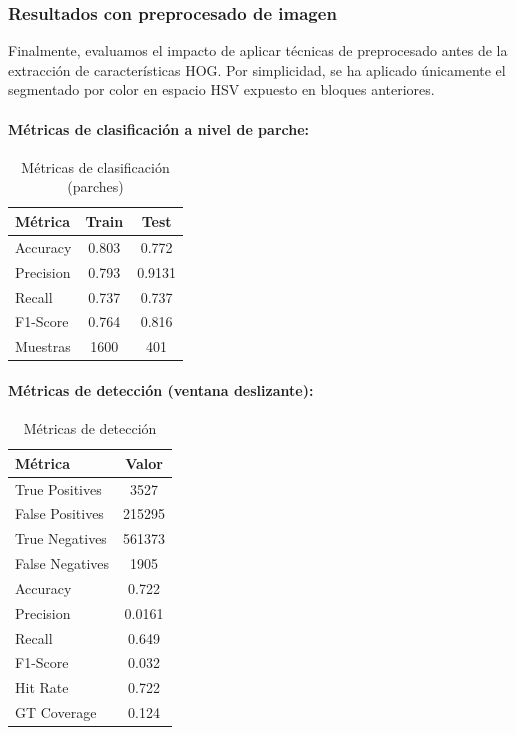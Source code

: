 \documentclass[11pt,a4paper]{article}
\begin{document}
\subsubsection{Resultados con preprocesado de imagen}

Finalmente, evaluamos el impacto de aplicar técnicas de preprocesado antes de 
la extracción de características HOG. Por simplicidad, se ha aplicado únicamente
el segmentado por color en espacio HSV expuesto en bloques anteriores.

\paragraph{Métricas de clasificación a nivel de parche:}
\begin{table}[H]
    \centering
    \caption{Métricas de clasificación (parches)}
    \label{tab:hog_preprocess_patch}
    \begin{tabular}{lcc}
        \toprule
        \textbf{Métrica} & \textbf{Train} & \textbf{Test} \\
        \midrule
        Accuracy & 0.803 & 0.772 \\
        Precision & 0.793 & 0.9131 \\
        Recall & 0.737 & 0.737 \\
        F1-Score & 0.764 & 0.816\\
        Muestras & 1600 & 401 \\
        \bottomrule
    \end{tabular}
\end{table}

\paragraph{Métricas de detección (ventana deslizante):}
\begin{table}[H]
    \centering
    \caption{Métricas de detección}
    \label{tab:hog_preprocess_detection}
    \begin{tabular}{lc}
        \toprule
        \textbf{Métrica} & \textbf{Valor} \\
        \midrule
        True Positives & 3527 \\
        False Positives & 215295 \\
        True Negatives & 561373 \\
        False Negatives & 1905 \\
        Accuracy & 0.722 \\
        Precision & 0.0161 \\
        Recall & 0.649\\
        F1-Score & 0.032 \\
        Hit Rate & 0.722 \\
        GT Coverage & 0.124 \\
        \bottomrule
    \end{tabular}
\end{table}
\end{document}
